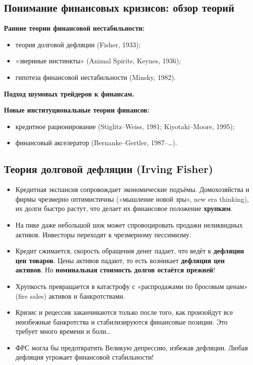 \documentclass[10pt,a4paper]{article}
\begin{document}
\subsection{Понимание финансовых кризисов: обзор теорий}

\textbf{Ранние теории финансовой нестабильности:}
\begin{itemize}[leftmargin=1.3em]
\item теория долговой дефляции (Fisher, 1933);
\item «звериные инстинкты» (Animal Spirits, Keynes, 1936);
\item гипотеза финансовой нестабильности (Minsky, 1982).
\end{itemize}
\textbf{Подход шумовых трейдеров к финансам.}

\textbf{Новые институциональные теории финансов:}
\begin{itemize}[leftmargin=1.3em]
\item кредитное рационирование (Stiglitz--Weiss, 1981; Kiyotaki--Moore, 1995);
\item финансовый акселератор (Bernanke--Gertler, 1987--\ldots).
\end{itemize}

\subsection{Теория долговой дефляции (Irving Fisher)}

\begin{itemize}[leftmargin=1.3em]
\item Кредитная экспансия сопровождает экономические подъёмы. Домохозяйства и фирмы чрезмерно оптимистичны («мышление новой эры», new era thinking), их долги быстро растут, что делает их финансовое положение \textbf{хрупким}.
\item На пике даже небольшой шок может спровоцировать продажи неликвидных активов. Инвесторы переходят к чрезмерному пессимизму.
\item Кредит сжимается, скорость обращения денег падает, что ведёт к \textbf{дефляции цен товаров}. Цены активов падают, то есть возникает \textbf{дефляция цен активов}. Но \textbf{номинальная стоимость долгов остаётся прежней}!
\item Хрупкость превращается в катастрофу с «распродажами по бросовым ценам» (fire sales) активов и банкротствами.
\item Кризис и рецессия заканчиваются только после того, как произойдут все неизбежные банкротства и стабилизируются финансовые позиции. Это требует много времени и боли\ldots
\item ФРС могла бы предотвратить Великую депрессию, избежав дефляции. Любая дефляция угрожает финансовой стабильности!
\end{itemize}
\end{document}
